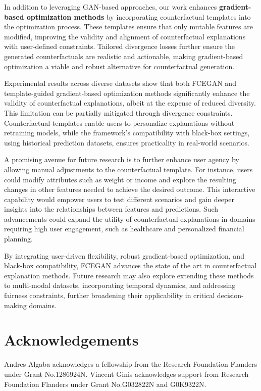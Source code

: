\documentclass[runningheads]{llncs}
\begin{document}
In addition to leveraging GAN-based approaches, our work enhances \textbf{gradient-based optimization methods} by incorporating counterfactual templates into the optimization process. These templates ensure that only mutable features are modified, improving the validity and alignment of counterfactual explanations with user-defined constraints. Tailored divergence losses further ensure the generated counterfactuals are realistic and actionable, making gradient-based optimization a viable and robust alternative for counterfactual generation.

Experimental results across diverse datasets show that both FCEGAN and template-guided gradient-based optimization methods significantly enhance the validity of counterfactual explanations, albeit at the expense of reduced diversity. This limitation can be partially mitigated through divergence constraints. Counterfactual templates enable users to personalize explanations without retraining models, while the framework's compatibility with black-box settings, using historical prediction datasets, ensures practicality in real-world scenarios.

A promising avenue for future research is to further enhance user agency by allowing manual adjustments to the counterfactual template. For instance, users could modify attributes such as weight or income and explore the resulting changes in other features needed to achieve the desired outcome. This interactive capability would empower users to test different scenarios and gain deeper insights into the relationships between features and predictions. Such advancements could expand the utility of counterfactual explanations in domains requiring high user engagement, such as healthcare and personalized financial planning.

By integrating user-driven flexibility, robust gradient-based optimization, and black-box compatibility, FCEGAN advances the state of the art in counterfactual explanation methods. Future research may also explore extending these methods to multi-modal datasets, incorporating temporal dynamics, and addressing fairness constraints, further broadening their applicability in critical decision-making domains.

\clearpage
\section*{Acknowledgements}
Andres Algaba acknowledges a fellowship from the Research Foundation Flanders under Grant No.1286924N. Vincent Ginis acknowledges support from Research Foundation Flanders under Grant No.G032822N and G0K9322N.
\end{document}
